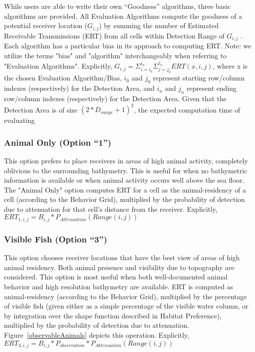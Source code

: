 While users are able to write their own “Goodness” algorithms, three basic algorithms are provided.  All Evaluation Algorithms compute the goodness of a potential receiver location ($G_{i,j}$) by summing the number of Estimated Receivable Transmissions (ERT) from all cells within Detection Range of $G_{i,j}$ .  Each algorithm has a particular bias in its approach to computing ERT.  Note: we utilize the terms "bias" and "algorithm" interchangeably when referring to "Evaluation Algorithms".\newline
\newline
Explicitly, $G_{i,j} = \Sigma_{i=i_0}^{i_n} \Sigma_{j=j_0}^{j_n} ERT(x,i,j)$, where x is the chosen Evaluation Algorithm/Bias, $i_0$ and $j_0$ represent starting row/column indexes (respectively) for the Detection Area, and $i_n$ and $j_n$ represent ending row/column indexes (respectively) for the Detection Area.  Given that the Detection Area is of size $(2*D_{range}+1)^2$, the expected computation time of evaluating

\subsubsection{Animal Only (Option “1”)}
\label{bias1}
This option prefers to place receivers in areas of high animal activity, completely oblivious to the surrounding bathymetry.  This is useful for when no bathymetric information is available or when animal activity occurs well above the sea floor.   The "Animal Only" option computes ERT for a cell as the animal-residency of a cell (according to the Behavior Grid), multiplied by the probability of detection due to attenuation for that cell's distance from the receiver.\newline
Explicitly,
$ERT_{1,i,j} = B_{i,j} * P_{Attenuation}(Range(i,j))$

\subsubsection{Visible Fish (Option “3”)}
\label{bias3}
This option chooses receiver locations that have the best view of areas of high animal residency.  Both animal presence and visibility due to topography are considered. This option is most useful when both well-documented animal behavior and high resolution bathymetry are available.  ERT is computed as animal-residency (according to the Behavior Grid), multiplied by the percentage of visible fish (given either as a simple percentage of the visible water column, or by integration over the shape function described in Habitat Preference), multiplied by the probability of detection due to attenuation.  Figure~\ref{observableAnimals} depicts this operation.\newline
Explicitly,
$ERT_{3,i,j} =  B_{i,j} * P_{observation} * P_{Attenuation}(Range(i,j))$

